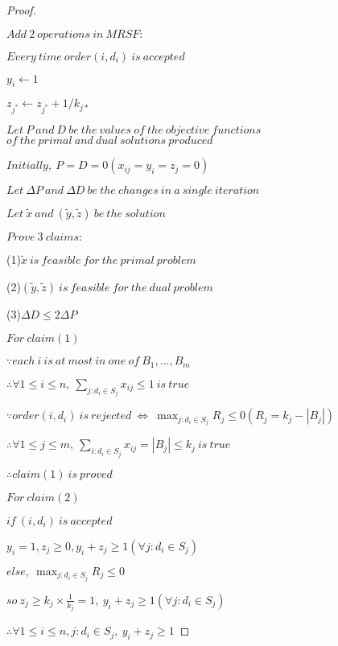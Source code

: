 \begin{proof}
{
    ~
    \par \(Add\ 2\ operations\ in\ MRSF:\)
    \par \quad \(Every\ time\ order(i, d_i)\ is\ accepted\)
    \par \quad \(y_i\leftarrow 1\)
    \par \quad \(z_{j^*}\leftarrow z_{j^*} + 1/k_{j*}\)
    \par \(Let\ P\ and\ D\ be\ the\ values\ of\ the\ objective\ functions\)\\
    \(of\ the\ primal\ and\ dual\ solutions\ produced\)
    \par \(Initially,\ P=D=0(x_{ij}=y_i=z_j=0)\)
    \par \(Let\ \Delta P\ and\ \Delta D\ be\ the\ changes\ in\ a\ single\ iteration\)
    \par \(Let\ \tilde{x}\ and\ (\tilde{y}, \tilde{z})\ be\ the\ solution\)
    \par \(Prove\ 3\ claims:\)
    \par \quad (1)\(\tilde{x}\ is\ feasible\ for\ the\ primal\ problem\)
    \par \quad (2)\((\tilde{y}, \tilde{z})\ is\ feasible\ for\ the\ dual\ problem\)
    \par \quad (3)\(\Delta D \leq 2\Delta P\)
    \par \(For\ claim(1)\)
    \par \(\because each\ i\ is\ at\ most\ in\ one\ of\ B_1,...,B_m\)
    \par \(\therefore \forall 1\leq i\leq n,\ \sum_{j:d_i\in S_j}x_{ij}\leq 1\ is\ true\)
    \par \(\because order(i, d_i)\ is\ rejected\ \iff\ \max_{j:d_i\in S_j}R_j\leq 0(R_j = k_j - |B_j|)\)
    \par \(\therefore \forall 1\leq j\leq m,\ \sum_{i:d_i\in S_j}x_{ij} = |B_j|\leq k_j\ is\ true\)
    \par \(\therefore claim(1)\ is\ proved\)
    \par \(For\ claim(2)\)
    \par \(if\ (i, d_i)\ is\ accepted\)
    \par \(y_i = 1, z_j\geq 0, y_i+z_j\geq 1(\forall j:d_i\in S_j)\)
    \newpage
    \par \(else,\ \max_{j:d_i\in S_j}R_j\leq 0\)
    \par \(so\ z_j\geq k_j\times \frac1{k_j} = 1,\ y_i+z_j\geq 1(\forall j:d_i\in S_j)\)
    \par \(\therefore \forall 1\leq i\leq n, j:d_i\in S_j,\ y_i+z_j\geq 1\)
}
\end{proof}
